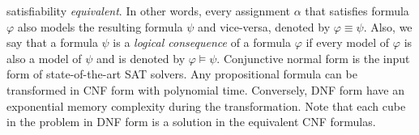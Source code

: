 satisfiability \emph{equivalent}.  
In other words, every assignment $\alpha$ that satisfies formula $\varphi$  also models the resulting formula $\psi$
and vice-versa, denoted by $\varphi \equiv \psi$.
 Also, we say that a formula $\psi$ is a \emph{logical consequence} of a formula $\varphi$ if every model of $\varphi$
 is also a model of $\psi$ and is denoted by $\varphi \models \psi$.
Conjunctive normal form is the input form of state-of-the-art SAT solvers. Any propositional
formula can be transformed in CNF form with polynomial time\cite{Russell1994ArtiCI}. Conversely, DNF form have
an exponential memory complexity during the transformation\cite{darwiche2002knowledge}.
Note that each cube in the problem in DNF form is a solution in the equivalent CNF formulas.
%
